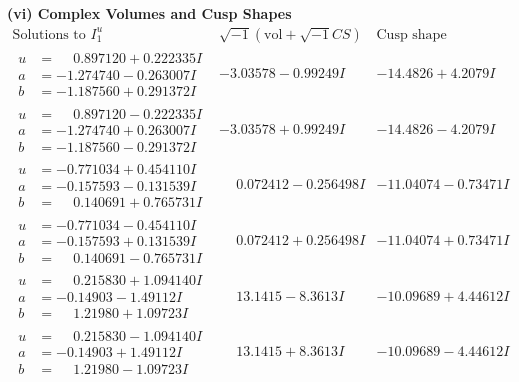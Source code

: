 \documentclass[1p]{elsarticle_modified}
\theoremstyle{definition}
\newcommand{\I}{\sqrt{-1}}
\begin{document}
\newpage\flushleft \textbf{(vi) Complex Volumes and Cusp Shapes}
$$\begin{array}{c|c|c}  
\text{Solutions to }I^u_{1}& \I (\text{vol} + \sqrt{-1}CS) & \text{Cusp shape}\\
 \hline 
\begin{aligned}
u &= \phantom{-}0.897120 + 0.222335 I \\
a &= -1.274740 - 0.263007 I \\
b &= -1.187560 + 0.291372 I\end{aligned}
 & -3.03578 - 0.99249 I & -14.4826 + 4.2079 I \\ \hline\begin{aligned}
u &= \phantom{-}0.897120 - 0.222335 I \\
a &= -1.274740 + 0.263007 I \\
b &= -1.187560 - 0.291372 I\end{aligned}
 & -3.03578 + 0.99249 I & -14.4826 - 4.2079 I \\ \hline\begin{aligned}
u &= -0.771034 + 0.454110 I \\
a &= -0.157593 - 0.131539 I \\
b &= \phantom{-}0.140691 + 0.765731 I\end{aligned}
 & \phantom{-}0.072412 - 0.256498 I & -11.04074 - 0.73471 I \\ \hline\begin{aligned}
u &= -0.771034 - 0.454110 I \\
a &= -0.157593 + 0.131539 I \\
b &= \phantom{-}0.140691 - 0.765731 I\end{aligned}
 & \phantom{-}0.072412 + 0.256498 I & -11.04074 + 0.73471 I \\ \hline\begin{aligned}
u &= \phantom{-}0.215830 + 1.094140 I \\
a &= -0.14903 - 1.49112 I \\
b &= \phantom{-}1.21980 + 1.09723 I\end{aligned}
 & \phantom{-}13.1415 - 8.3613 I & -10.09689 + 4.44612 I \\ \hline\begin{aligned}
u &= \phantom{-}0.215830 - 1.094140 I \\
a &= -0.14903 + 1.49112 I \\
b &= \phantom{-}1.21980 - 1.09723 I\end{aligned}
 & \phantom{-}13.1415 + 8.3613 I & -10.09689 - 4.44612 I \\ \hline\begin{aligned}

\end{aligned}
\end{array}$$
\end{document}

